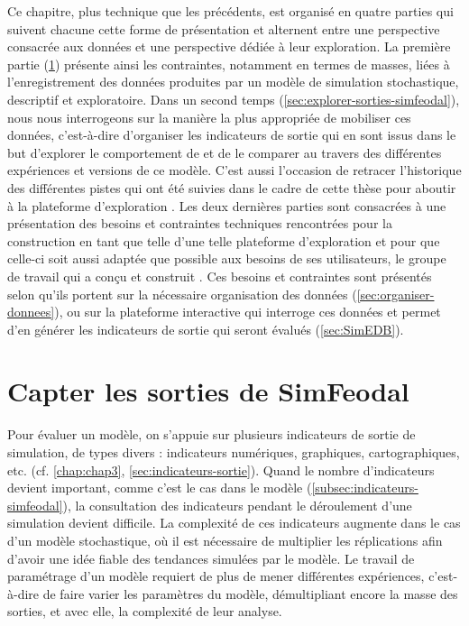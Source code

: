 Ce chapitre, plus technique que les précédents, est organisé en quatre parties qui suivent chacune cette forme de présentation et alternent entre une perspective consacrée aux données et une perspective dédiée à leur exploration.
La première partie (\cref{sec:sorties-simfeodal}) présente ainsi les contraintes, notamment en termes de masses, liées à l'enregistrement des données produites par un modèle de simulation stochastique, descriptif et exploratoire.
Dans un second temps (\cref{sec:explorer-sorties-simfeodal}), nous nous interrogeons sur la manière la plus appropriée de mobiliser ces données, c'est-à-dire d'organiser les indicateurs de sortie qui en sont issus dans le but d'explorer le comportement de \simfeodal{} et de le comparer au travers des différentes expériences et versions de ce modèle.
C'est aussi l'occasion de retracer l'historique des différentes pistes qui ont été suivies dans le cadre de cette thèse pour aboutir à la plateforme d'exploration \simedb{}.
Les deux dernières parties sont consacrées à une présentation des besoins et contraintes techniques rencontrées pour la construction en tant que telle d'une telle plateforme d'exploration et pour que celle-ci soit aussi adaptée que possible aux besoins de ses utilisateurs, le groupe de travail qui a conçu et construit \simfeodal{}.
Ces besoins et contraintes sont présentés selon qu'ils portent sur la nécessaire organisation des données (\cref{sec:organiser-donnees}), ou sur la plateforme interactive qui interroge ces données et permet d'en générer les indicateurs de sortie qui seront évalués (\cref{sec:SimEDB}).

\section[Capter les sorties de SimFeodal]{{Capter les sorties de SimFeodal}%
	}\label{sec:sorties-simfeodal}

Pour évaluer un modèle, on s'appuie sur plusieurs indicateurs de sortie de simulation, de types divers : indicateurs numériques, graphiques, cartographiques, etc. (cf. \cref{chap:chap3}, \cref{sec:indicateurs-sortie}).
Quand le nombre d'indicateurs devient important, comme c'est le cas dans le modèle \simfeodal{} (\cref{subsec:indicateurs-simfeodal}), la consultation des indicateurs pendant le déroulement d'une simulation devient difficile.
La complexité de ces indicateurs augmente dans le cas d'un modèle stochastique, où il est nécessaire de multiplier les réplications afin d'avoir une idée fiable des tendances simulées par le modèle.
Le travail de paramétrage d'un modèle requiert de plus de mener différentes expériences, c'est-à-dire de faire varier les paramètres du modèle, démultipliant encore la masse des sorties, et avec elle, la complexité de leur analyse.

